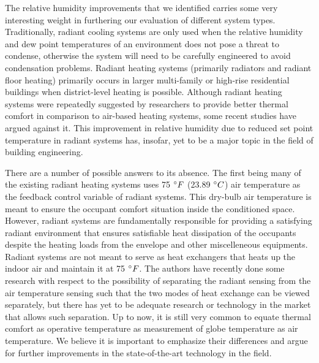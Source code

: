 The relative humidity improvements that we identified carries some very interesting weight in furthering our evaluation of different system types. Traditionally, radiant cooling systems are only used when the relative humidity and dew point temperatures of an environment does not pose a threat to condense, otherwise the system will need to be carefully engineered to avoid condensation problems. Radiant heating systems (primarily radiators and radiant floor heating) primarily occurs in larger multi-family or high-rise residential buildings when district-level heating is possible. Although radiant heating systems were repeatedly suggested by researchers to provide better thermal comfort in comparison to air-based heating systems, some recent studies have argued against it. This improvement in relative humidity due to reduced set point temperature in radiant systems has, insofar, yet to be a major topic in the field of building engineering.

There are a number of possible answers to its absence. The first being many of the existing radiant heating systems uses 75 $\degree F$ (23.89 $\degree C$) air temperature as the feedback control variable of radiant systems. This dry-bulb air temperature is meant to ensure the occupant comfort situation inside the conditioned space. However, radiant systems are fundamentally responsible for providing a satisfying radiant environment that ensures satisfiable heat dissipation of the occupants despite the heating loads from the envelope and other miscelleneous equipments. Radiant systems are not meant to serve as heat exchangers that heats up the indoor air and maintain it at 75 $\degree F$. The authors have recently done some research with respect to the possibility of separating the radiant sensing from the air temperature sensing such that the two modes of heat exchange can be viewed separately, but there has yet to be adequate research or technology in the market that allows such separation. Up to now, it is still very common to equate thermal comfort as operative temperature as measurement of globe temperature as air temperature. We believe it is important to emphasize their differences and argue for further improvements in the state-of-the-art technology in the field.

